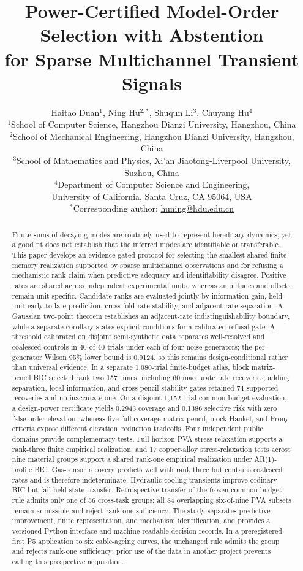 \documentclass[11pt]{article}
\title{Power-Certified Model-Order Selection with Abstention\\for Sparse Multichannel Transient Signals}
\author{Haitao Duan$^{1}$, Ning Hu$^{2,*}$, Shuqun Li$^{3}$, Chuyang Hu$^{4}$\\[2mm]
\small $^1$School of Computer Science, Hangzhou Dianzi University, Hangzhou, China\\
\small $^2$School of Mechanical Engineering, Hangzhou Dianzi University, Hangzhou, China\\
\small $^3$School of Mathematics and Physics, Xi'an Jiaotong-Liverpool University, Suzhou, China\\
\small $^4$Department of Computer Science and Engineering,\\
\small University of California, Santa Cruz, CA 95064, USA\\[1mm]
\small $^*$Corresponding author: \href{mailto:huning@hdu.edu.cn}{huning@hdu.edu.cn}}
\date{}
\newcommand{\doublespacing}{\renewcommand{\baselinestretch}{2}\selectfont}
\begin{document}
\doublespacing
\maketitle

\begin{abstract}
Finite sums of decaying modes are routinely used to represent hereditary dynamics, yet a good fit does not establish that the inferred modes are identifiable or transferable. This paper develops an evidence-gated protocol for selecting the smallest shared finite memory realization supported by sparse multichannel observations and for refusing a mechanistic rank claim when predictive adequacy and identifiability disagree. Positive rates are shared across independent experimental units, whereas amplitudes and offsets remain unit specific. Candidate ranks are evaluated jointly by information gain, held-unit early-to-late prediction, cross-fold rate stability, and adjacent-rate separation. A Gaussian two-point theorem establishes an adjacent-rate indistinguishability boundary, while a separate corollary states explicit conditions for a calibrated refusal gate. A threshold calibrated on disjoint semi-synthetic data separates well-resolved and coalesced controls in 40 of 40 trials under each of four noise generators; the per-generator Wilson 95\% lower bound is 0.9124, so this remains design-conditional rather than universal evidence. In a separate 1,080-trial finite-budget atlas, block matrix-pencil BIC selected rank two 157 times, including 60 inaccurate rate recoveries; adding separation, local-information, and cross-pencil stability gates retained 74 supported recoveries and no inaccurate one. On a disjoint 1,152-trial common-budget evaluation, a design-power certificate yields 0.2943 coverage and 0.1386 selective risk with zero false order elevation, whereas five full-coverage matrix-pencil, block-Hankel, and Prony criteria expose different elevation--reduction tradeoffs. Four independent public domains provide complementary tests. Full-horizon PVA stress relaxation supports a rank-three finite empirical realization, and 17 copper-alloy stress-relaxation tests across nine material groups support a shared rank-one empirical realization under AR(1)-profile BIC. Gas-sensor recovery predicts well with rank three but contains coalesced rates and is therefore indeterminate. Hydraulic cooling transients improve ordinary BIC but fail held-state transfer. Retrospective transfer of the frozen common-budget rule admits only one of 56 cross-task groups; all 84 overlapping six-of-nine PVA subsets remain admissible and reject rank-one sufficiency. The study separates predictive improvement, finite representation, and mechanism identification, and provides a versioned Python interface and machine-readable decision records.
In a preregistered first P5 application to six cable-ageing curves, the unchanged rule admits the group and rejects rank-one sufficiency; prior use of the data in another project prevents calling this prospective acquisition.
\end{abstract}
\end{document}
